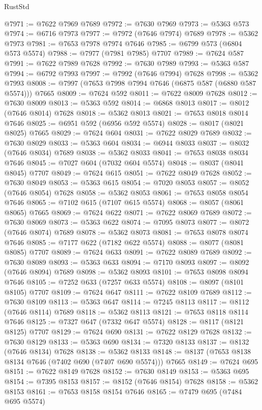 \begin{lexlean}{RustStd}
\begin{coremodule}
@7971 := @7622 @7969 @7689
@7972 := @7630 @7969
@7973 := @5363 @573
@7974 := @6716 @7973
@7977 := @7972 (@7646 @7974) @7689
@7978 := @5362 @7973
@7981 := @7653 @7978 @7974 @7646
@7985 := @6799 @573 (@6804 @573 @5574)
@7988 := @7977 (@7981 @7985) @7707
@7989 := @7624 @587
@7991 := @7622 @7989 @7628
@7992 := @7630 @7989
@7993 := @5363 @587
@7994 := @6792 @7993
@7997 := @7992 (@7646 @7994) @7628
@7998 := @5362 @7993
@8008 := @7997 (@7653 @7998 @7994 @7646 (@6875 @587 (@6880 @587 @5574))) @7665
@8009 := @7624 @592
@8011 := @7622 @8009 @7628
@8012 := @7630 @8009
@8013 := @5363 @592
@8014 := @6868 @8013
@8017 := @8012 (@7646 @8014) @7628
@8018 := @5362 @8013
@8021 := @7653 @8018 @8014 @7646
@8025 := @6951 @592 (@6956 @592 @5574)
@8028 := @8017 (@8021 @8025) @7665
@8029 := @7624 @604
@8031 := @7622 @8029 @7689
@8032 := @7630 @8029
@8033 := @5363 @604
@8034 := @6944 @8033
@8037 := @8032 (@7646 @8034) @7689
@8038 := @5362 @8033
@8041 := @7653 @8038 @8034 @7646
@8045 := @7027 @604 (@7032 @604 @5574)
@8048 := @8037 (@8041 @8045) @7707
@8049 := @7624 @615
@8051 := @7622 @8049 @7628
@8052 := @7630 @8049
@8053 := @5363 @615
@8054 := @7020 @8053
@8057 := @8052 (@7646 @8054) @7628
@8058 := @5362 @8053
@8061 := @7653 @8058 @8054 @7646
@8065 := @7102 @615 (@7107 @615 @5574)
@8068 := @8057 (@8061 @8065) @7665
@8069 := @7624 @622
@8071 := @7622 @8069 @7689
@8072 := @7630 @8069
@8073 := @5363 @622
@8074 := @7095 @8073
@8077 := @8072 (@7646 @8074) @7689
@8078 := @5362 @8073
@8081 := @7653 @8078 @8074 @7646
@8085 := @7177 @622 (@7182 @622 @5574)
@8088 := @8077 (@8081 @8085) @7707
@8089 := @7624 @633
@8091 := @7622 @8089 @7689
@8092 := @7630 @8089
@8093 := @5363 @633
@8094 := @7170 @8093
@8097 := @8092 (@7646 @8094) @7689
@8098 := @5362 @8093
@8101 := @7653 @8098 @8094 @7646
@8105 := @7252 @633 (@7257 @633 @5574)
@8108 := @8097 (@8101 @8105) @7707
@8109 := @7624 @647
@8111 := @7622 @8109 @7689
@8112 := @7630 @8109
@8113 := @5363 @647
@8114 := @7245 @8113
@8117 := @8112 (@7646 @8114) @7689
@8118 := @5362 @8113
@8121 := @7653 @8118 @8114 @7646
@8125 := @7327 @647 (@7332 @647 @5574)
@8128 := @8117 (@8121 @8125) @7707
@8129 := @7624 @690
@8131 := @7622 @8129 @7628
@8132 := @7630 @8129
@8133 := @5363 @690
@8134 := @7320 @8133
@8137 := @8132 (@7646 @8134) @7628
@8138 := @5362 @8133
@8148 := @8137 (@7653 @8138 @8134 @7646 (@7402 @690 (@7407 @690 @5574))) @7665
@8149 := @7624 @695
@8151 := @7622 @8149 @7628
@8152 := @7630 @8149
@8153 := @5363 @695
@8154 := @7395 @8153
@8157 := @8152 (@7646 @8154) @7628
@8158 := @5362 @8153
@8161 := @7653 @8158 @8154 @7646
@8165 := @7479 @695 (@7484 @695 @5574)

\end{coremodule}
\end{lexlean}
